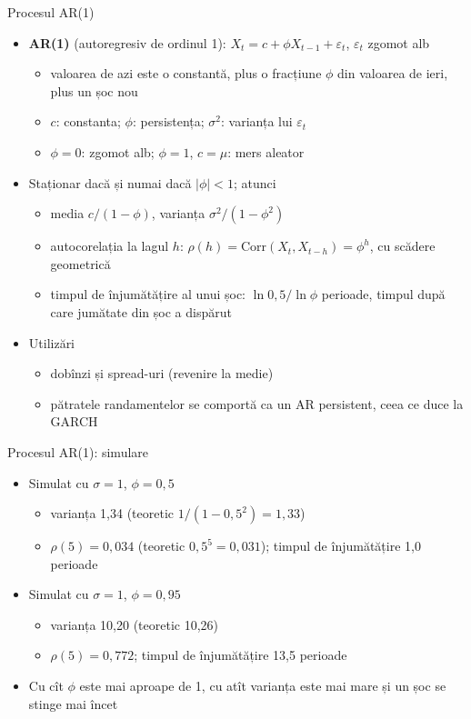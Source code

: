 \begin{frame}{Procesul AR(1)}
\itemsize{\footnotesize}
\begin{itemize}
    \item \textbf{AR(1)} (autoregresiv de ordinul 1): $X_t = c + \phi X_{t-1} + \varepsilon_t$, $\varepsilon_t$ zgomot alb
    \begin{itemize}
        \item valoarea de azi este o constantă, plus o fracțiune $\phi$ din valoarea de ieri, plus un șoc nou
        \item $c$: constanta; $\phi$: persistența; $\sigma^2$: varianța lui $\varepsilon_t$
        \item $\phi = 0$: zgomot alb; $\phi = 1$, $c = \mu$: mers aleator
    \end{itemize}
    \item Staționar dacă și numai dacă $|\phi| < 1$; atunci
    \begin{itemize}
        \item media $c/(1 - \phi)$, varianța $\sigma^2/(1 - \phi^2)$
        \item autocorelația la lagul $h$: $\rho(h) = \text{Corr}(X_t, X_{t-h}) = \phi^h$, cu scădere geometrică
        \item timpul de înjumătățire al unui șoc: $\ln 0{,}5/\ln\phi$ perioade, timpul după care jumătate din șoc a dispărut
    \end{itemize}
    \item Utilizări
    \begin{itemize}
        \item dobînzi și spread-uri (revenire la medie)
        \item pătratele randamentelor se comportă ca un AR persistent, ceea ce duce la GARCH
    \end{itemize}
\end{itemize}
\end{frame}

\begin{frame}{Procesul AR(1): simulare}
\itemsize{\small}
\begin{itemize}
    \item Simulat cu $\sigma = 1$, $\phi = 0{,}5$
    \begin{itemize}
        \item varianța 1{,}34 (teoretic $1/(1 - 0{,}5^2) = 1{,}33$)
        \item $\rho(5) = 0{,}034$ (teoretic $0{,}5^5 = 0{,}031$); timpul de înjumătățire 1{,}0 perioade
    \end{itemize}
    \item Simulat cu $\sigma = 1$, $\phi = 0{,}95$
    \begin{itemize}
        \item varianța 10{,}20 (teoretic 10{,}26)
        \item $\rho(5) = 0{,}772$; timpul de înjumătățire 13{,}5 perioade
    \end{itemize}
    \item Cu cît $\phi$ este mai aproape de 1, cu atît varianța este mai mare și un șoc se stinge mai încet
\end{itemize}
\end{frame}

